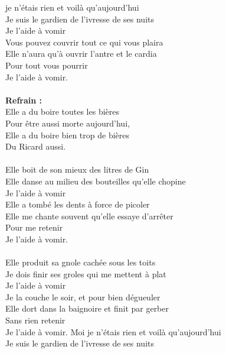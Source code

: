 
 je n'étais rien et voilà qu'aujourd'hui
\\Je suis le gardien de l'ivresse de ses nuits
\\Je l'aide à vomir
\\Vous pouvez couvrir tout ce qui vous plaira
\\Elle n'aura qu'à ouvrir l'antre et le cardia
\\Pour tout vous pourrir \bissimple
\\Je l'aide à vomir.
\\\\\textbf{Refrain :}
\\Elle a du boire toutes les bières
\\Pour être aussi morte aujourd'hui,
\\Elle a du boire bien trop de bières
\\Du Ricard aussi.
\\\\Elle boit de son mieux des litres de Gin
\\Elle danse au milieu des bouteilles qu'elle chopine
\\Je l'aide à vomir
\\Elle a tombé les dents à force de picoler
\\Elle me chante souvent qu'elle essaye d'arrêter
\\Pour me retenir \bissimple
\\Je l'aide à vomir.
\\\\Elle produit sa gnole cachée sous les toits
\\Je dois finir ses groles qui me mettent à plat
\\Je l'aide à vomir
\\Je la couche le soir, et pour bien dégueuler
\\Elle dort dans la baignoire et finit par gerber
\\Sans rien retenir \bissimple
\\Je l'aide à vomir.
\breakpage
Moi je n'étais rien et voilà qu'aujourd'hui
\\Je suis le gardien de l'ivresse de ses nuits
